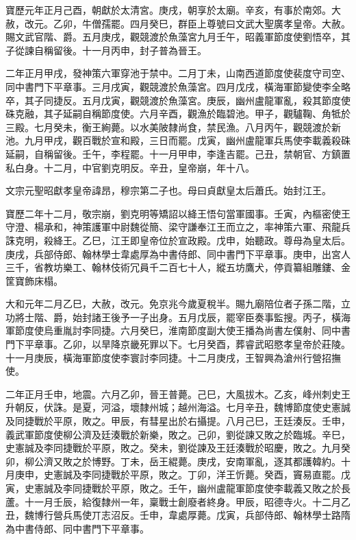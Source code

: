 \begin{pinyinscope}
 寶歷元年正月己酉，朝獻於太清宮。庚戌，朝享於太廟。辛亥，有事於南郊。大赦，改元。乙卯，牛僧孺罷。四月癸巳，群臣上尊號曰文武大聖廣孝皇帝。大赦。賜文武官階、爵。五月庚戌，觀競渡於魚藻宮九月壬午，昭義軍節度使劉悟卒，其子從諫自稱留後。十一月丙申，封子普為晉王。



 二年正月甲戌，發神策六軍穿池于禁中。二月丁未，山南西道節度使裴度守司空、同中書門下平章事。三月戌寅，觀競渡於魚藻宮。四月戊戌，橫海軍節變使李全略卒，其子同捷反。五月戊寅，觀競渡於魚藻宮。庚辰，幽州盧龍軍亂，殺其節度使硃克融，其子延嗣自稱節度使。六月辛酉，觀漁於臨碧池。甲子，觀驢鞠、角牴於三殿。七月癸未，衡王絢薨。以水美陂隸尚食，禁民漁。八月丙午，觀競渡於新池。九月甲戌，觀百戰於宣和殿，三日而罷。戊寅，幽州盧龍軍兵馬使李載義殺硃延嗣，自稱留後。壬午，李程罷。十一月甲申，李逢吉罷。己丑，禁朝官、方鎮置私白身。十二月，中官劉克明反。辛丑，皇帝崩，年十八。



 文宗元聖昭獻孝皇帝諱昂，穆宗第二子也。母曰貞獻皇太后蕭氏。始封江王。



 寶歷二年十二月，敬宗崩，劉克明等矯詔以絳王悟句當軍國事。壬寅，內樞密使王守澄、楊承和，神策護軍中尉魏從簡、梁守謙奉江王而立之，率神策六軍、飛龍兵誅克明，殺絳王。乙巳，江王即皇帝位於宣政殿。戊申，始聽政。尊母為皇太后。庚戌，兵部侍郎、翰林學士韋處厚為中書侍郎、同中書門下平章事。庚申，出宮人三千，省教坊樂工、翰林伎術冗員千二百七十人，縱五坊鷹犬，停貢纂組雕鏤、金筐寶飾床榻。



 大和元年二月乙巳，大赦，改元。免京兆今歲夏稅半。賜九廟陪位者子孫二階，立功將士階、爵，始封諸王後予一子出身。五月戊辰，罷宰臣奏事監搜。丙子，橫海軍節度使烏重胤討李同捷。六月癸巳，淮南節度副大使王播為尚書左僕射、同中書門下平章事。乙卯，以旱降京畿死罪以下。七月癸酉，葬睿武昭愍孝皇帝於莊陵。十一月庚辰，橫海軍節度使李寰討李同捷。十二月庚戌，王智興為滄州行營招撫使。



 二年正月壬申，地震。六月乙卯，晉王普薨。己巳，大風拔木。乙亥，峰州刺史王升朝反，伏誅。是夏，河溢，壞隸州城；越州海溢。七月辛丑，魏博節度使史憲誠及同捷戰於平原，敗之。甲辰，有彗星出於右攝提。八月己巳，王廷湊反。壬申，義武軍節度使柳公濟及廷湊戰於新樂，敗之。己卯，劉從諫又敗之於臨城。辛巳，史憲誠及李同捷戰於平原，敗之。癸未，劉從諫及王廷湊戰於昭慶，敗之。九月癸卯，柳公濟又敗之於博野。丁未，岳王緄薨。庚戌，安南軍亂，逐其都護韓約。十月庚申，史憲誠及李同捷戰於平原，敗之。丁卯，洋王忻薨。癸酉，竇易直罷。戊寅，史憲誠及李同捷戰於平原，敗之。壬午，幽州盧龍軍節度使李載義又敗之於長蘆。十一月壬辰，給復隸州一年，稟戰士創廢者終身。甲辰，昭德寺火。十二月乙丑，魏博行營兵馬使丌志沼反。壬申，韋處厚薨。戊寅，兵部侍郎、翰林學士路隋為中書侍郎、同中書門下平章事。




\end{pinyinscope}
